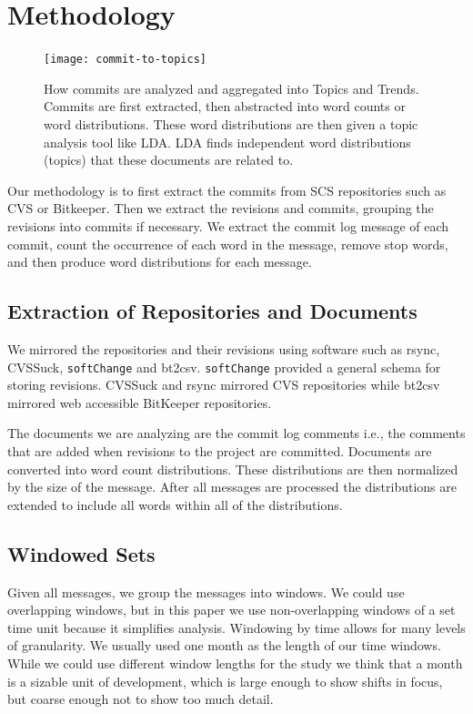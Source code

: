 \documentclass[times, 10pt,twocolumn]{article}
\newcommand{\shrinkit}{\vspace*{-.3em}}
\begin{document}
\shrinkit
\section{Methodology}
\shrinkit
\begin{figure}[t]
  \centering
  \texttt{[image: commit-to-topics]} 
  \caption{How commits are analyzed and aggregated into Topics and Trends. Commits are first extracted, then abstracted into word counts or word distributions. These word distributions are then given a topic analysis tool like LDA. LDA finds independent word distributions (topics) that these documents are related to.}
  \label{fig:commits}
\end{figure}



Our methodology is to first extract the commits from SCS repositories
such as CVS or Bitkeeper. Then we extract the revisions and commits,
grouping the revisions into commits if necessary. We extract the
commit log message of each commit, count the occurrence of each word
in the message, remove stop words, and then produce word distributions
for each message.


\shrinkit
\subsection{Extraction of  Repositories and Documents}
\shrinkit

We mirrored the repositories and their revisions using software such
as rsync, CVSSuck, \texttt{softChange} and bt2csv.
\texttt{softChange} provided a general schema for storing
revisions. CVSSuck and rsync mirrored CVS repositories while bt2csv
mirrored web accessible BitKeeper repositories.

The documents we are analyzing are the commit log comments i.e., the
comments that are added when revisions to the project are committed.
Documents are converted into word count distributions. These
distributions are then normalized by the size of the message. After
all messages are processed the distributions are extended to include
all words within all of the  distributions.

\shrinkit
\subsection{Windowed Sets}
\shrinkit

Given all messages, we group the messages into windows. We could use
overlapping windows, but in this paper we use non-overlapping windows
of a set time unit because it simplifies analysis.  Windowing by time
allows for many levels of granularity.  We usually used one month as
the length of our time windows. While we could use different window
lengths for the study we think that a month is a sizable unit of
development, which is large enough to show shifts in focus, but coarse
enough not to show too much detail.
\end{document}
